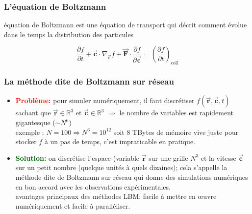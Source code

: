 \documentclass[utf8,usenames,dvipsnames,hyperref={pdfpagemode=FullScreen,urlcolor=blue}]{beamer}
\begin{document}
\begin{frame}
  \frametitle{L'équation de Boltzmann}

  équation de Boltzmann est une équation de transport qui décrit comment évolue dans le temps la distribution des particules

  \begin{equation*}
    \frac{\partial f}{\partial t} + \overrightarrow{\mathbf{c}}\cdot\nabla_{\overrightarrow{\mathbf{r}}} f + \overrightarrow{\mathbf{F}} \cdot \frac{\partial f}{\partial \overrightarrow{\mathbf{c}}} = \left(\frac{\partial f}{\partial t} \right)_\mathrm{coll}
  \end{equation*}

\end{frame}

\begin{frame}
  \frametitle{La méthode dite de Boltzmann sur réseau}

  \begin{itemize}
  \item \textcolor{red}{\bf Problème:} pour simuler numériquement, il faut discrétiser $f(\overrightarrow{\mathbf{r}},\overrightarrow{\mathbf{c}},t)$ sachant que $\overrightarrow{\mathbf{r}} \in \mathbb{R}^{3}$ et $\overrightarrow{\mathbf{c}} \in \mathbb{R}^{3}$ $\Rightarrow$ le nombre de variables est rapidement gigantesque ($\sim N^{6}$)\\
exemple : $N=100 \Rightarrow N^{6}= 10^{12}$ soit 8 TBytes de mémoire vive juste pour stocker $f$ à un pas de temps, c'est impraticable en pratique.
  \item \textcolor{darkgreen}{\bf Solution:} on discrétise l'espace (variable $\overrightarrow{\mathbf{r}}$ sur une grille $N^{3}$ et la vitesse $\overrightarrow{\mathbf{c}}$ sur un petit nombre (quelque unités à quels dizaines); cela s'appelle la méthode dite de Boltzmann sur réseau qui donne des simulations numériques en bon accord avec les observations expérimentales.\\
    avantages principaux des méthodes LBM: facile à mettre en \oe uvre numériquement et facile à paralléliser.
  \end{itemize}

\end{frame}
\end{document}
